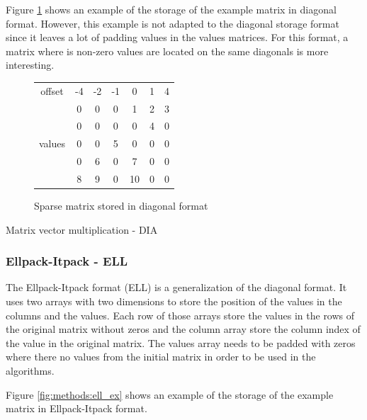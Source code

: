 Figure \ref{fig:methods:dia_ex} shows an example of the storage of the example matrix in diagonal format.
However, this example is not adapted to the diagonal storage format since it leaves a lot of padding values in the values matrices.
For this format, a matrix where is non-zero values are located on the same diagonals is more interesting.

\begin{figure}
\centering
\begin{tabular}{c|cccccc|}
	\cline{2-7}
	        offset          & -4 & -2 & -1 & 0  & 1 & 4 \\ \cline{2-7}
	\multirow{5}{*}{values} & 0  & 0  & 0  & 1  & 2 & 3 \\
	                        & 0  & 0  & 0  & 0  & 4 & 0 \\
	                        & 0  & 0  & 5  & 0  & 0 & 0 \\
	                        & 0  & 6  & 0  & 7  & 0 & 0 \\
	                        & 8  & 9  & 0  & 10 & 0 & 0 \\ \cline{2-7}
\end{tabular}
\caption{Sparse matrix stored in diagonal format \label{fig:methods:dia_ex}}
\end{figure}

\begin{algorithm}[h]
	\DontPrintSemicolon
	\caption{Matrix vector multiplication - DIA\label{fig:methods:dia_algo}}
\end{algorithm}


\subsubsection{Ellpack-Itpack - ELL}
The Ellpack-Itpack format (ELL) is a generalization of the diagonal format.
It uses two arrays with two dimensions to store the position of the values in the columns and the values.
Each row of those arrays store the values in the rows of the original matrix without zeros and the column array store the column index of the value in the original matrix.
The values array needs to be padded with zeros where there no values from the initial matrix in order to be used in the algorithms.

Figure \ref{fig:methods:ell_ex} shows an example of the storage of the example matrix in Ellpack-Itpack format.


